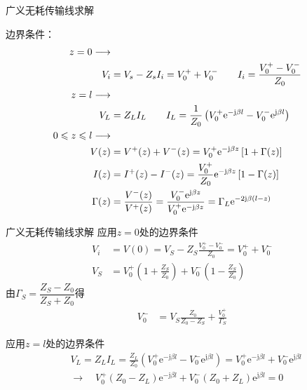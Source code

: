 \begin{frame}{广义无耗传输线求解}

  \flushleft
  边界条件：
  \begin{align}
    z=0\longrightarrow   \notag                                                                                                                                              \\
    V_i       & =V_s-Z_sI_i=V_0^++V_0^- \qquad   I_i =\frac{V_0^+-V_0^-}{Z_0} \notag                                                                                         \\
    z=l\longrightarrow              \notag                                                                                                                                   \\
    V_L       & =Z_LI_L    \qquad      I_L =\frac{1}{Z_0}\left( V_0^+\mathrm{e}^{-\mathrm{j}\beta l}-V_0^-\mathrm{e}^{\mathrm{j}\beta l}\right) \notag                       \\
    0\leqslant z \leqslant l \longrightarrow  \notag                                                                                                                         \\
    V(z)      & = V^+(z)+V^-(z) = V_0^+\mathrm{e}^{-\mathrm{j}\beta z}\left[ 1+\Gamma(z)\right]\label{eqn1}                                                                  \\
    I(z)      & = I^+(z)-I^-(z) = \frac{V_0^+}{Z_0}\mathrm{e}^{-\mathrm{j}\beta z}\left[1-\Gamma(z)\right]\label{eqn2}                                                       \\
    \Gamma(z) & =\dfrac{V^-(z)}{V^+(z)}=\dfrac{V_0^-\mathrm{e}^{\mathrm{j}\beta z}}{V_0^+\mathrm{e}^{-\mathrm{j}\beta z}}=\Gamma_L\mathrm{e}^{-2\mathrm{j}\beta(l-z)} \notag
  \end{align}

\end{frame}

\begin{frame}{广义无耗传输线求解}
  应用$z=0$处的边界条件
  \begin{align}
    V_i & =V(0)=V_S-Z_S\frac{V_0^+ - V_0^-}{Z_0}=V_0^+ + V_0^-                         \\
    V_S & =V_0^+\left( 1+\frac{Z_S}{Z_0}\right) + V_0^-\left( 1-\frac{Z_S}{Z_0}\right)
  \end{align}
  由$\Gamma_S=\dfrac{Z_S-Z_0}{Z_S+Z_0}$得\\
  \begin{align}
    V_0^- & =V_S\frac{Z_0}{Z_0-Z_S}+\frac{V_0^+}{\Gamma_S}\label{eqn5}
  \end{align}

  应用$z=l$处的边界条件
  \begin{align}
     & V_L=Z_LI_L=\frac{Z_L}{Z_0}(V_0^+\mathrm{e}^{-\mathrm{j}\beta l}-V_0^-\mathrm{e}^{\mathrm{j}\beta l})=V_0^+\mathrm{e}^{-\mathrm{j}\beta l}+V_0^-\mathrm{e}^{\mathrm{j}\beta l} \\
     & \rightarrow \quad V_0^+(Z_0-Z_L)\mathrm{e}^{-\mathrm{j}\beta l}+V_0^-(Z_0+Z_L)\mathrm{e}^{\mathrm{j}\beta l}=0\label{eqn7}
  \end{align}
\end{frame}

